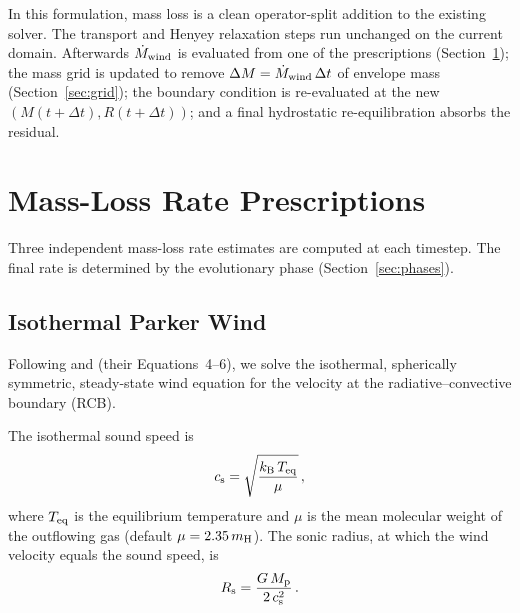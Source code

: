 \documentclass{aastex701}
\newcommand{\Mdot}{\dot{M}}
\newcommand{\Mp}{M_{\rm p}}
\newcommand{\Rs}{R_{\rm s}}
\newcommand{\Teq}{T_{\rm eq}}
\newcommand{\cs}{c_{\rm s}}
\begin{document}
In this formulation, mass loss is a clean operator-split addition to
the existing solver.  The transport and Henyey relaxation steps run
unchanged on the current domain.  Afterwards $\Mdot_{\rm wind}$ is
evaluated from one of the prescriptions (Section~\ref{sec:rates}); the
mass grid is updated to remove $\Delta M = \Mdot_{\rm wind}\,\Delta t$
of envelope mass (Section~\ref{sec:grid}); the boundary condition is
re-evaluated at the new $(M(t+\Delta t),R(t+\Delta t))$; and a final
hydrostatic re-equilibration absorbs the residual.

\section{Mass-Loss Rate Prescriptions}\label{sec:rates}

Three independent mass-loss rate estimates are computed at each timestep.
The final rate is determined by the evolutionary phase
(Section~\ref{sec:phases}).

\subsection{Isothermal Parker Wind}\label{subsec:parker}

Following \citet{Parker1958} and \citet{Tang2024} (their Equations~4--6),
we solve the isothermal, spherically symmetric, steady-state wind
equation for the velocity at the radiative--convective boundary (RCB).

The isothermal sound speed is
\begin{equation}\label{eq:cs}
  \cs = \sqrt{\frac{k_{\rm B}\,\Teq}{\mu}}\,,
\end{equation}
where $\Teq$ is the equilibrium temperature and $\mu$ is the mean
molecular weight of the outflowing gas (default
$\mu = 2.35\,m_{\rm H}$).  The sonic radius, at which the wind
velocity equals the sound speed, is
\begin{equation}\label{eq:Rs}
  \Rs = \frac{G\,\Mp}{2\,\cs^{2}}\,.
\end{equation}
\end{document}
